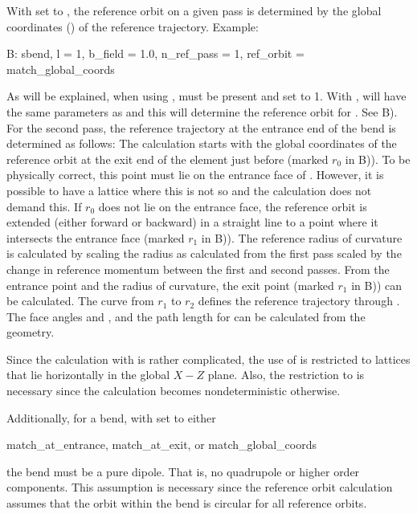 With  set to , the reference
orbit on a given pass is determined by the global coordinates
() of the reference trajectory. Example:
\begin{example} 
  B: sbend, l = 1, b_field = 1.0, n_ref_pass = 1, ref_orbit = match_global_coords
\end{example}
As will be explained, when using ,
 must be present and set to 1. With
,  will have the same parameters as
 and this will determine the reference orbit for . See
B). For the second pass, the reference
trajectory at the entrance end of the bend is determined as follows:
The calculation starts with the global coordinates of the reference
orbit at the exit end of the element just before  (marked
$r_0$ in B)). To be physically correct,
this point must lie on the entrance face of . However, it is
possible to have a lattice where this is not so and the calculation
does not demand this. If $r_0$ does not lie on the entrance face, the
reference orbit is extended (either forward or backward) in a straight
line to a point where it intersects the entrance face (marked $r_1$ in
B)). The reference radius of curvature is
calculated by scaling the radius as calculated from the first pass
scaled by the change in reference momentum between the first and
second passes. From the entrance point and the radius of curvature,
the exit point (marked $r_1$ in B)) can
be calculated. The curve from $r_1$ to $r_2$ defines the reference
trajectory through . The face angles  and , and
the path length  for  can be calculated from the
geometry.

Since the calculation with  is rather
complicated, the use of  is restricted to
lattices that lie horizontally in the global $X-Z$ plane. Also, the
restriction to  is necessary since the calculation
becomes nondeterministic otherwise. 

Additionally, for a bend, with  set to either
\begin{example}
  match_at_entrance,
  match_at_exit, or
  match_global_coords
\end{example}
the bend must be a pure dipole. That is, no quadrupole or higher order
components. This assumption is necessary since the reference orbit
calculation assumes that the orbit within the bend is circular for all
reference orbits.

